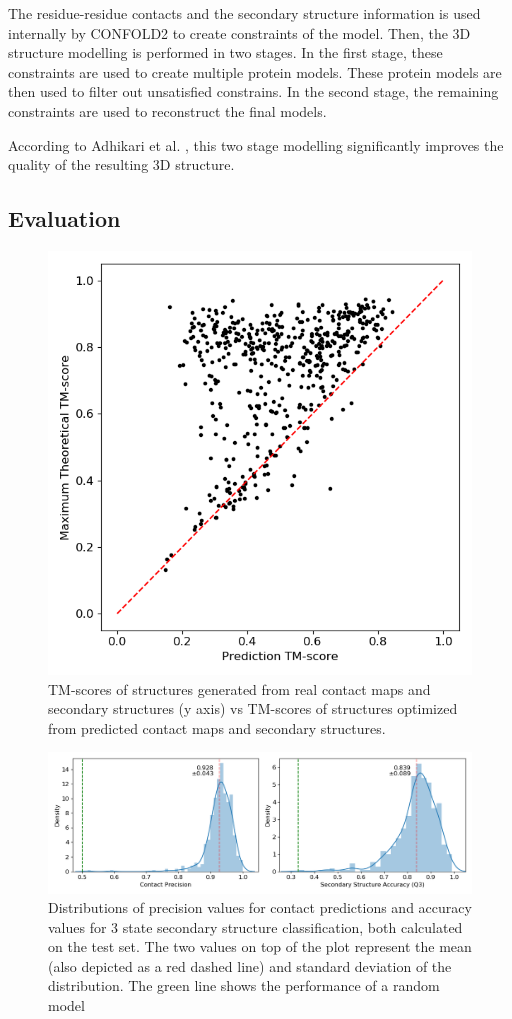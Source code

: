 The residue-residue contacts and the secondary structure information is used internally by CONFOLD2 to create constraints of the model.
Then, the 3D structure modelling is performed in two stages.
In the first stage, these constraints are used to create multiple protein models.
These protein models are then used to filter out unsatisfied constrains.
In the second stage, the remaining constraints are used to reconstruct the final models.

According to Adhikari et al. \cite{confold}, this two stage modelling significantly improves the quality of the resulting 3D structure.

\subsection{Evaluation}

\begin{figure}
    \centering
    \includegraphics[width=0.6\linewidth]{imgs_tomas/test_tmscore.png}
    \caption{TM-scores of structures generated from real contact maps and secondary structures (y axis) vs TM-scores of structures optimized from predicted contact maps and secondary structures.}
    \label{fig:test_tmscore}
\end{figure}

\begin{figure}
    \centering
    \includegraphics[width=\linewidth]{imgs_tomas/contacts_secondary_eval.png}
    \caption{Distributions of precision values for contact predictions and accuracy values for 3 state secondary structure classification, both calculated on the test set. The two values on top of the plot represent the mean (also depicted as a red dashed line) and standard deviation of the distribution. The green line shows the performance of a random model}
    \label{fig:contacts_sec}
\end{figure}

